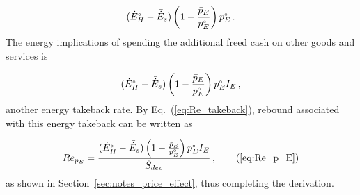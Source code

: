 \begin{equation}
    ({}{\dot{E}}^{\scriptscriptstyle \circ}_H - \bar{\dot{E}}_s) \left( 1 - \frac{\bar{p}_E}{{}{p}^{\scriptscriptstyle \circ}_E} \right) {}{p}^{\scriptscriptstyle \circ}_E \, .
\end{equation}
%
The energy implications of spending the additional freed cash
on other goods and services is

\begin{equation}
    ({}{\dot{E}}^{\scriptscriptstyle \circ}_H - \bar{\dot{E}}_s) \left( 1 - \frac{\bar{p}_E}{{}{p}^{\scriptscriptstyle \circ}_E} \right) {}{p}^{\scriptscriptstyle \circ}_E I_E \, ,
\end{equation}
%
another energy takeback rate.
By Eq.~(\ref{eq:Re_takeback}),
rebound associated with this energy takeback
can be written as

\begin{equation}
  Re_{p_E} = \frac{(\rorig{E}_H - \rainc{E}_s) \left( 1 - \frac{\ainc{p}_E}{\orig{p}_E} \right) \orig{p}_E I_E}{\Sdot} \, , \tag{\ref{eq:Re_p_E}}
\end{equation}
%
as shown in Section~\ref{sec:notes_price_effect},
thus completing the derivation.



